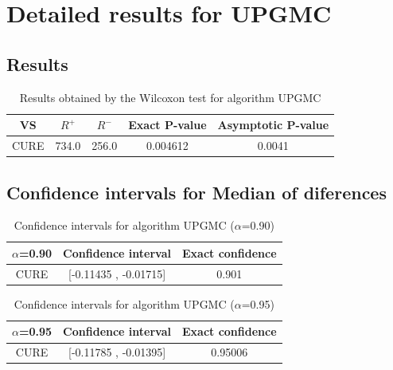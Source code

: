 \documentclass[a4paper,10pt]{article}
\begin{document}
 \clearpage 


\section{Detailed results for UPGMC}


\subsection{Results}

\begin{table}[!htp]
\centering\small
\begin{tabular}{
|c|c|c|c|c|}
\hline
 VS & $R^{+}$ & $R^{-}$ & Exact P-value & Asymptotic P-value \\ \hline 
CURE & 734.0 & 256.0 & 0.004612 & 0.0041\\ \hline 

\end{tabular}
\caption{Results obtained by the Wilcoxon test for algorithm UPGMC}
\end{table}

\subsection{Confidence intervals for Median of diferences}

\begin{table}[!htp]
\centering\small
\begin{tabular}{
|c|c|c|}
\hline
 $\alpha$=0.90 & Confidence interval & Exact confidence \\ \hline 
CURE & [-0.11435 , -0.01715] & 0.901\\ \hline 

\end{tabular}
\caption{Confidence intervals for algorithm UPGMC ($\alpha$=0.90)}
\end{table}
\begin{table}[!htp]
\centering\small
\begin{tabular}{
|c|c|c|}
\hline
 $\alpha$=0.95 & Confidence interval & Exact confidence \\ \hline 
CURE & [-0.11785 , -0.01395] & 0.95006\\ \hline 

\end{tabular}
\caption{Confidence intervals for algorithm UPGMC ($\alpha$=0.95)}
\end{table}

 \clearpage 
\end{document}
